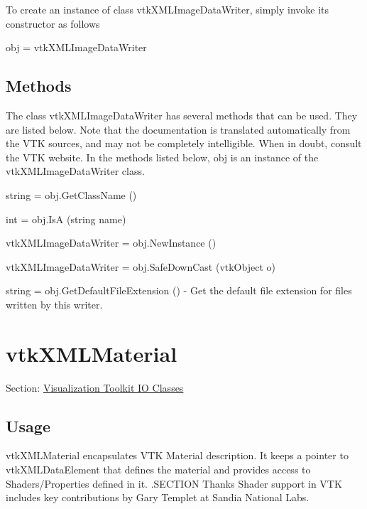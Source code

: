 To create an instance of class vtk\-X\-M\-L\-Image\-Data\-Writer, simply invoke its constructor as follows \begin{DoxyVerb}  obj = vtkXMLImageDataWriter
\end{DoxyVerb}
 \hypertarget{vtkwidgets_vtkxyplotwidget_Methods}{}\subsection{Methods}\label{vtkwidgets_vtkxyplotwidget_Methods}
The class vtk\-X\-M\-L\-Image\-Data\-Writer has several methods that can be used. They are listed below. Note that the documentation is translated automatically from the V\-T\-K sources, and may not be completely intelligible. When in doubt, consult the V\-T\-K website. In the methods listed below, {\ttfamily obj} is an instance of the vtk\-X\-M\-L\-Image\-Data\-Writer class. 
\begin{DoxyItemize}
\item {\ttfamily string = obj.\-Get\-Class\-Name ()}  
\item {\ttfamily int = obj.\-Is\-A (string name)}  
\item {\ttfamily vtk\-X\-M\-L\-Image\-Data\-Writer = obj.\-New\-Instance ()}  
\item {\ttfamily vtk\-X\-M\-L\-Image\-Data\-Writer = obj.\-Safe\-Down\-Cast (vtk\-Object o)}  
\item {\ttfamily string = obj.\-Get\-Default\-File\-Extension ()} -\/ Get the default file extension for files written by this writer.  
\end{DoxyItemize}\hypertarget{vtkio_vtkxmlmaterial}{}\section{vtk\-X\-M\-L\-Material}\label{vtkio_vtkxmlmaterial}
Section\-: \hyperlink{sec_vtkio}{Visualization Toolkit I\-O Classes} \hypertarget{vtkwidgets_vtkxyplotwidget_Usage}{}\subsection{Usage}\label{vtkwidgets_vtkxyplotwidget_Usage}
vtk\-X\-M\-L\-Material encapsulates V\-T\-K Material description. It keeps a pointer to vtk\-X\-M\-L\-Data\-Element that defines the material and provides access to Shaders/\-Properties defined in it. .S\-E\-C\-T\-I\-O\-N Thanks Shader support in V\-T\-K includes key contributions by Gary Templet at Sandia National Labs.

